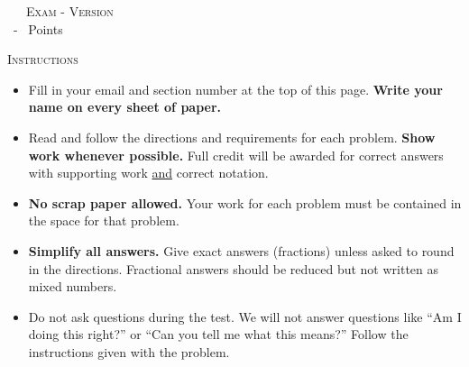 \begin{center}
  \textsc{\GetTerm \ \GetCourse \ \GetExamUnit \ Exam - Version \GetVersionID {}}\\
  \footnotesize \GetExamLength \ - \pointssum* \ Points
\end{center}

\noindent \textsc{Instructions}
\begin{small}
\begin{itemize}
\item Fill in your email and section number at the top of this page. \textbf{Write your name on every sheet of paper.}
\item Read and follow the directions and requirements for each problem. \textbf{Show work whenever possible.} Full credit will be awarded for correct answers with supporting work \underline{and} correct notation.
\item \textbf{No scrap paper allowed.} Your work for each problem must be contained in the space for that problem.
\item \textbf{Simplify all answers.} Give exact answers (fractions) unless asked to round in the directions. Fractional answers should be reduced but not written as mixed numbers.
\item Do not ask questions during the test. We will not answer questions like ``Am I doing this right?'' or ``Can you tell me what this means?'' Follow the instructions given with the problem.\\
\end{itemize}
\end{small}

